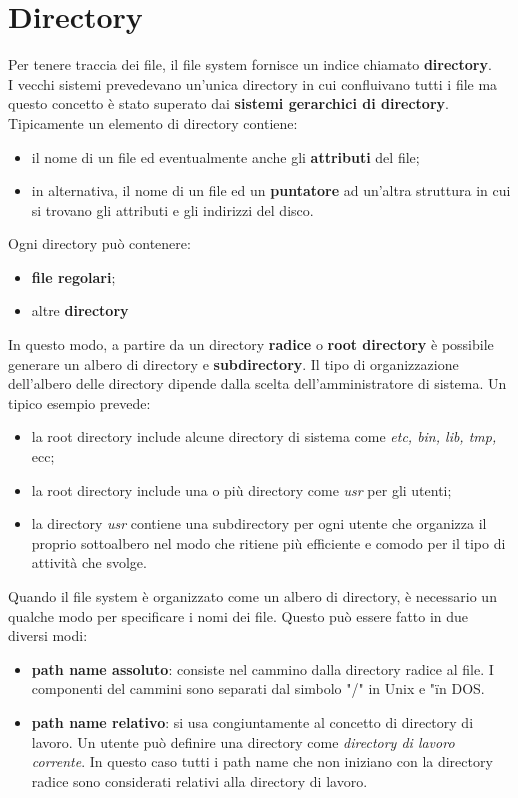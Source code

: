 \documentclass[12pt, letterpaper]{report}
\begin{document}
	\section{Directory}
	Per tenere traccia dei file, il file system fornisce un indice chiamato \textbf{directory}. \\
	I vecchi sistemi prevedevano un'unica directory in cui confluivano tutti i file ma questo concetto è stato superato dai \textbf{sistemi gerarchici di directory}. \\
	Tipicamente un elemento di directory contiene:
	\begin{itemize}
		\item il nome di un file ed eventualmente anche gli \textbf{attributi} del file;
		\item in alternativa, il nome di un file ed un \textbf{puntatore} ad un'altra struttura in cui si trovano gli attributi e gli indirizzi del disco.
	\end{itemize}
	Ogni directory può contenere:
	\begin{itemize}
		\item \textbf{file regolari};
		\item altre \textbf{directory}
	\end{itemize}
	In questo modo, a partire da un directory \textbf{radice} o \textbf{root directory} è possibile generare un albero di directory e \textbf{subdirectory}. Il tipo di organizzazione dell'albero delle directory dipende dalla scelta dell'amministratore di sistema. Un tipico esempio prevede:
	\begin{itemize}
		\item la root directory include alcune directory di sistema come \textit{etc, bin, lib, tmp,} ecc;
		\item la root directory include una o più directory come \textit{usr} per gli utenti;
		\item la directory \textit{usr} contiene una subdirectory per ogni utente che organizza il proprio sottoalbero nel modo che ritiene più efficiente e comodo per il tipo di attività che svolge.
	\end{itemize}
	Quando il file system è organizzato come un albero di directory, è necessario un qualche modo per specificare i nomi dei file. Questo può essere fatto in due diversi modi:
	\begin{itemize}
		\item \textbf{path name assoluto}: consiste nel cammino dalla directory radice al file. I componenti del cammini sono separati dal simbolo "/" in Unix e "\" in DOS.
		\item \textbf{path name relativo}: si usa congiuntamente al concetto di directory di lavoro. Un utente può definire una directory come \textit{directory di lavoro corrente}. In questo caso tutti i path name che non iniziano con la directory radice sono considerati relativi alla directory di lavoro.
	\end{itemize}
\end{document}

